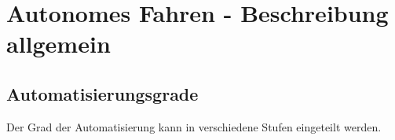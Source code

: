 \chapter{Autonomes Fahren - Beschreibung allgemein}
\section{Automatisierungsgrade}
Der Grad der Automatisierung kann in verschiedene Stufen eingeteilt werden.
